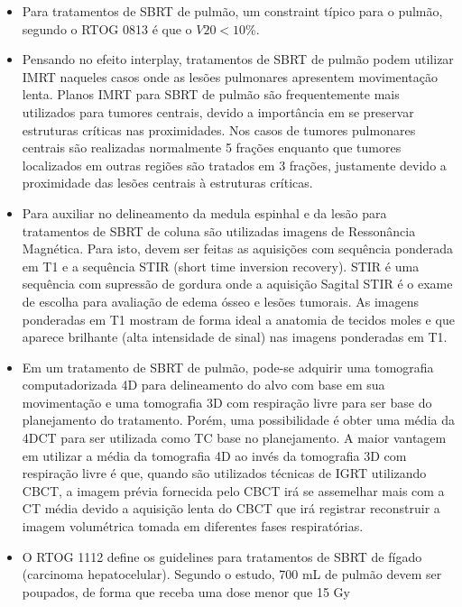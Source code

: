 \documentclass[11pt,a4paper]{article}
\newcounter{exemplo}
\begin{document}
\begin{exemplo}
\begin{itemize}
        \item Para tratamentos de SBRT de pulmão, um constraint típico para o pulmão, segundo o RTOG 0813 é que o $V20 < 10\%$.
        
        \item Pensando no efeito interplay, tratamentos de SBRT de pulmão podem utilizar IMRT naqueles casos onde as lesões pulmonares apresentem movimentação lenta. Planos IMRT para SBRT de pulmão são frequentemente mais utilizados para tumores centrais, devido a importância em se preservar estruturas críticas nas proximidades. Nos casos de tumores pulmonares centrais são realizadas normalmente 5 frações enquanto que tumores localizados em outras regiões são tratados em 3 frações, justamente devido a proximidade das lesões centrais à estruturas críticas.
        
        \item Para auxiliar no delineamento da medula espinhal e da lesão para tratamentos de SBRT de coluna são utilizadas imagens de Ressonância Magnética. Para isto, devem ser feitas as aquisições com sequência ponderada em T1 e a sequência STIR  (short time inversion recovery). STIR é uma sequência com supressão de gordura onde a aquisição Sagital STIR é o exame de escolha para avaliação de edema ósseo e lesões tumorais. As imagens ponderadas em T1 mostram de forma ideal a anatomia de tecidos moles e que aparece brilhante (alta intensidade de sinal) nas imagens ponderadas em T1.

        \item Em um tratamento de SBRT de pulmão, pode-se adquirir uma tomografia computadorizada 4D para delineamento do alvo com base em sua movimentação e uma tomografia 3D com respiração livre para ser base do planejamento do tratamento. Porém, uma possibilidade é obter uma média da 4DCT para ser utilizada como TC base no planejamento. A maior vantagem em utilizar a média da tomografia 4D ao invés da tomografia 3D com respiração livre é que, quando são utilizados técnicas de IGRT utilizando CBCT, a imagem prévia fornecida pelo CBCT irá se assemelhar mais com a CT média devido a aquisição lenta do CBCT que irá registrar reconstruir a imagem volumétrica tomada em diferentes fases respiratórias.
        
        \item O RTOG 1112 define os guidelines para tratamentos de SBRT de fígado (carcinoma hepatocelular). Segundo o estudo, 700 mL de pulmão devem ser poupados, de forma que receba uma dose menor que 15 Gy


\end{itemize}
\end{exemplo}
\end{document}
